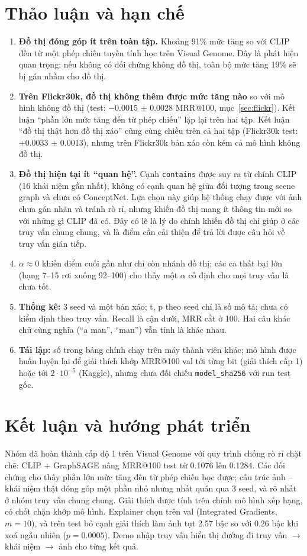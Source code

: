 \documentclass[12pt, a4paper]{article}
\makeatletter
\newcommand{\code}[1]{\texttt{#1}}
\newcommand{\mrr}{MRR@100}
\newcommand{\pmm}{\ensuremath{\pm}}
\makeatother
\begin{document}
\section{Thảo luận và hạn chế}
\begin{enumerate}
\item \textbf{Đồ thị đóng góp ít trên toàn tập.} Khoảng 91\% mức tăng so với CLIP đến từ một phép chiếu tuyến tính học trên Visual Genome. Đây là phát hiện quan trọng: nếu không có đối chứng không đồ thị, toàn bộ mức tăng 19\% sẽ bị gán nhầm cho đồ thị.
\item \textbf{Trên Flickr30k, đồ thị không thêm được mức tăng nào} so với mô hình không đồ thị (test: $-$0.0015 \pmm{} 0.0028 \mrr, mục~\ref{sec:flickr}). Kết luận ``phần lớn mức tăng đến từ phép chiếu'' lặp lại trên hai tập. Kết luận ``đồ thị thật hơn đồ thị xáo'' cũng cùng chiều trên cả hai tập (Flickr30k test: +0.0033 \pmm{} 0.0013), nhưng trên Flickr30k bản xáo còn kém cả mô hình không đồ thị.
\item \textbf{Đồ thị hiện tại ít ``quan hệ''.} Cạnh \code{contains} được suy ra từ chính CLIP (16 khái niệm gần nhất), không có cạnh quan hệ giữa đối tượng trong scene graph và chưa có ConceptNet. Lựa chọn này giúp hệ thống chạy được với ảnh chưa gán nhãn và tránh rò rỉ, nhưng khiến đồ thị mang ít thông tin mới so với những gì CLIP đã có. Đây có lẽ là lý do chính khiến đồ thị chỉ giúp ở các truy vấn chung chung, và là điểm cần cải thiện để trả lời được câu hỏi về truy vấn gián tiếp.
\item \textbf{$\alpha \approx 0$} khiến điểm cuối gần như chỉ còn nhánh đồ thị; các ca thất bại lớn (hạng 7--15 rơi xuống 92--100) cho thấy một $\alpha$ cố định cho mọi truy vấn là chưa tốt.
\item \textbf{Thống kê:} 3 seed và một bản xáo; t, p theo seed chỉ là số mô tả; chưa có kiểm định theo truy vấn. Recall là cận dưới, MRR cắt ở 100. Hai câu khác chữ cùng nghĩa (``a man'', ``man'') vẫn tính là khác nhau.
\item \textbf{Tái lập:} số trong bảng chính chạy trên máy thành viên khác; mô hình được huấn luyện lại để giải thích khớp \mrr{} val tới từng bit (giải thích cấp 1) hoặc tới $2\cdot 10^{-5}$ (Kaggle), nhưng chưa đối chiếu \code{model\_sha256} với run test gốc.
\end{enumerate}

\section{Kết luận và hướng phát triển}
\label{sec:future}
Nhóm đã hoàn thành cấp độ 1 trên Visual Genome với quy trình chống rò rỉ chặt chẽ: CLIP + GraphSAGE nâng \mrr{} test từ 0.1076 lên 0.1284. Các đối chứng cho thấy phần lớn mức tăng đến từ phép chiếu học được; cấu trúc ảnh -- khái niệm thật đóng góp một phần nhỏ nhưng nhất quán qua 3 seed, và rõ nhất ở nhóm truy vấn chung chung. Giải thích được tính trên chính mô hình xếp hạng, có chốt chặn khớp mô hình. Explainer chọn trên val (Integrated Gradients, $m=10$), và trên test bỏ cạnh giải thích làm ảnh tụt 2.57 bậc so với 0.26 bậc khi xoá ngẫu nhiên ($p=0.0005$). Demo nhập truy vấn hiển thị đường đi truy vấn $\to$ khái niệm $\to$ ảnh cho từng kết quả.
\end{document}
